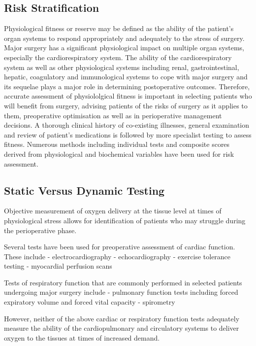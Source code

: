 \subsection{Risk Stratification}
Physiological fitness or reserve may be defined as the ability of the patient's organ systems to respond appropriately and adequately to the stress of surgery. Major surgery has a significant physiological impact on multiple organ systems, especially the cardiorespiratory system. The ability of the cardiorespiratory system as well as other physiological systems including renal, gastrointestinal, hepatic, coagulatory and immunological systems to cope with major surgery and its sequelae plays a major role in determining postoperative outcomes. Therefore, accurate assessment of physiololgical fitness is important in selecting patients who will benefit from surgery, advising patients of the risks of surgery as it applies to them, preoperative optimisation as well as in perioperative management decisions. A thorough clinical history of co-existing illnesses, general examination and review of patient's medications is followed by more specialist testing to assess fitness. Numerous methods including individual tests and composite scores derived from physiological and biochemical variables have been used for risk assessment.

\subsection{Static Versus Dynamic Testing}


Objective measurement of oxygen delivery at the tissue level at times of physiological stress allows for identification of patients who may struggle during the perioperative phase.

Several tests have been used for preoperative assessment of cardiac function. These include
- electrocardiography
- echocardiography
- exercise tolerance testing
- myocardial perfusion scans

Tests of respiratory function that are commonly performed in selected patients undergoing major surgery include
- pulmonary function tests including forced expiratory volume and forced vital capacity
- spirometry

However, neither of the above cardiac or respiratory function tests adequately measure the ability of the cardiopulmonary and circulatory systems to deliver oxygen to the tissues at times of increased demand.

